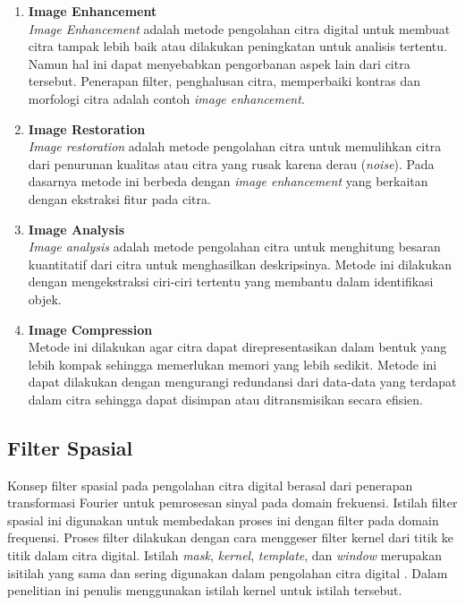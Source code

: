 \begin{enumerate} [label=\textbf{\alph*.}]
    \item \textbf{Image Enhancement} \\ 
    \textit{Image Enhancement} adalah metode pengolahan citra digital untuk membuat citra tampak lebih baik atau dilakukan peningkatan untuk analisis tertentu. Namun hal ini dapat menyebabkan pengorbanan aspek lain dari citra tersebut. Penerapan filter, penghalusan citra, memperbaiki kontras dan morfologi citra adalah contoh \textit{image enhancement}. 
    \item \textbf{Image Restoration} \\ 
    \textit{Image restoration} adalah metode pengolahan citra untuk memulihkan citra dari penurunan kualitas atau citra yang rusak karena derau (\textit{noise}). Pada dasarnya metode ini berbeda dengan \textit{image enhancement} yang berkaitan dengan ekstraksi fitur pada citra. 
    \item \textbf{Image Analysis} \\ 
    \textit{Image analysis} adalah metode pengolahan citra untuk menghitung besaran kuantitatif dari citra untuk menghasilkan deskripsinya. Metode ini dilakukan dengan mengekstraksi ciri-ciri tertentu yang membantu dalam identifikasi objek.
    \item \textbf{Image Compression} \\ 
    Metode ini dilakukan agar citra dapat direpresentasikan dalam bentuk yang lebih kompak sehingga memerlukan memori yang lebih sedikit. Metode ini dapat dilakukan dengan mengurangi redundansi dari data-data yang terdapat dalam citra sehingga dapat disimpan atau ditransmisikan secara efisien.
\end{enumerate}

\subsection{Filter Spasial}
Konsep filter spasial pada pengolahan citra digital berasal dari penerapan transformasi Fourier untuk pemrosesan sinyal pada domain frekuensi. Istilah filter spasial ini digunakan untuk membedakan proses ini dengan filter pada domain frequensi. Proses filter dilakukan dengan cara menggeser filter kernel dari titik ke titik dalam citra digital. Istilah \textit{mask}, \textit{kernel}, \textit{template}, dan \textit{window} merupakan isitilah yang sama dan sering digunakan dalam pengolahan citra digital . Dalam penelitian ini penulis menggunakan istilah kernel untuk istilah tersebut.

